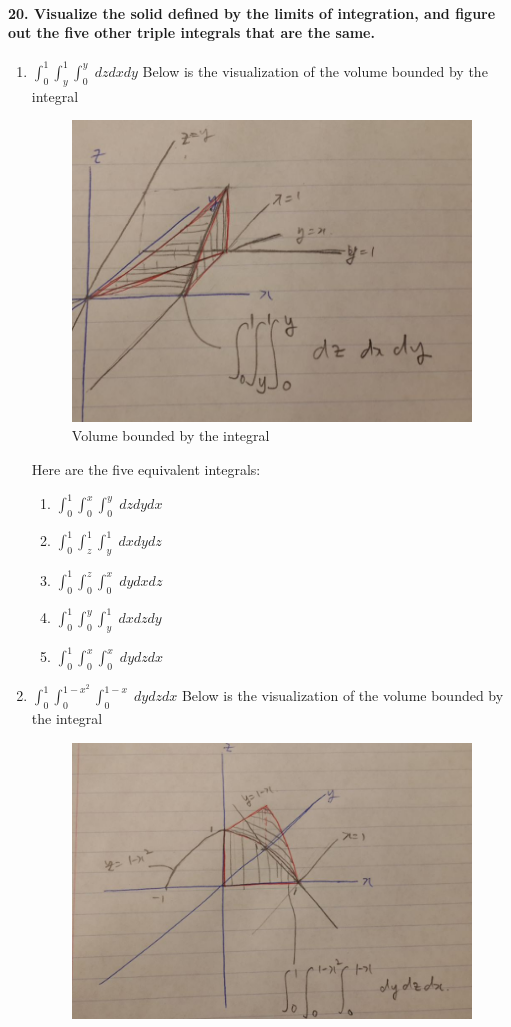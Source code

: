 \documentclass{article}
\begin{document}
\paragraph{20. Visualize the solid defined by the limits of integration, and figure out the five other triple integrals that are the same.}

\begin{enumerate}
    \item $\int_0^1 \int_y^1 \int_0^y \; dz dx dy$
    \newline Below is the visualization of the volume bounded by the integral
    \begin{figure}[H]
        \centering
        \includegraphics[width=0.75\columnwidth]{num201.JPG}
        \caption{Volume bounded by the integral}
        \label{fig:my_label}
    \end{figure}
    \newline Here are the five equivalent integrals:
    \begin{enumerate}
        \item $\int_0^1 \int_0^x \int_0^y \; dz dy dx$ 
        \item $\int_0^1 \int_z^1 \int_y^1 \; dx dy dz$
        \item $\int_0^1 \int_0^z \int_0^x \; dy dx dz$
        \item $\int_0^1 \int_0^y \int_y^1 \; dx dz dy$
        \item $\int_0^1 \int_0^x \int_0^x \; dy dz dx$
    \end{enumerate}
    \item $\int_0^1 \int_0^{1-x^2} \int_0^{1-x} \; dy dz dx$
    \newline Below is the visualization of the volume bounded by the integral
    \begin{figure}[H]
        \centering
        \includegraphics[width=0.75\columnwidth]{num20_2.JPG}

\end{figure}
\end{enumerate}
\end{document}
